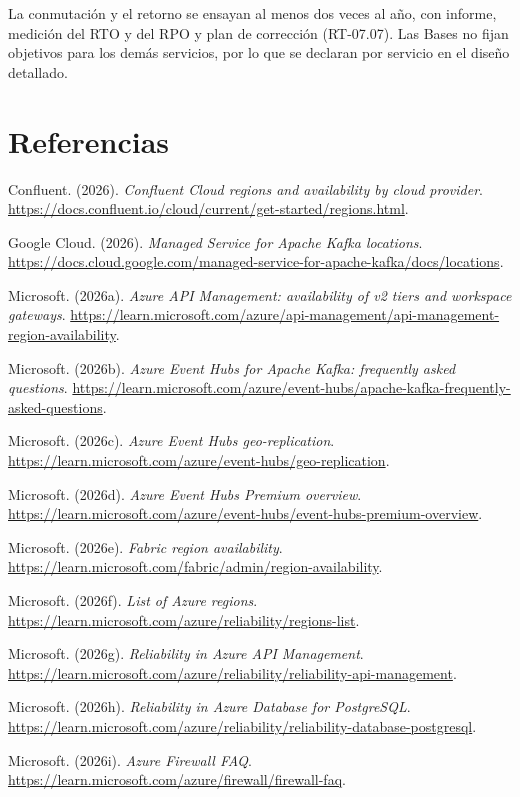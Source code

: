 \documentclass[11pt]{article}
\begin{document}
La conmutación y el retorno se ensayan al menos dos veces al año, con informe, medición del RTO y del RPO y plan de corrección (RT-07.07). Las Bases no fijan objetivos para los demás servicios, por lo que se declaran por servicio en el diseño detallado.

\section*{Referencias}

Confluent. (2026). \textit{Confluent Cloud regions and availability by cloud provider}. \url{https://docs.confluent.io/cloud/current/get-started/regions.html}.

Google Cloud. (2026). \textit{Managed Service for Apache Kafka locations}. \url{https://docs.cloud.google.com/managed-service-for-apache-kafka/docs/locations}.

Microsoft. (2026a). \textit{Azure API Management: availability of v2 tiers and workspace gateways}. \url{https://learn.microsoft.com/azure/api-management/api-management-region-availability}.

Microsoft. (2026b). \textit{Azure Event Hubs for Apache Kafka: frequently asked questions}. \url{https://learn.microsoft.com/azure/event-hubs/apache-kafka-frequently-asked-questions}.

Microsoft. (2026c). \textit{Azure Event Hubs geo-replication}. \url{https://learn.microsoft.com/azure/event-hubs/geo-replication}.

Microsoft. (2026d). \textit{Azure Event Hubs Premium overview}. \url{https://learn.microsoft.com/azure/event-hubs/event-hubs-premium-overview}.

Microsoft. (2026e). \textit{Fabric region availability}. \url{https://learn.microsoft.com/fabric/admin/region-availability}.

Microsoft. (2026f). \textit{List of Azure regions}. \url{https://learn.microsoft.com/azure/reliability/regions-list}.

Microsoft. (2026g). \textit{Reliability in Azure API Management}. \url{https://learn.microsoft.com/azure/reliability/reliability-api-management}.

Microsoft. (2026h). \textit{Reliability in Azure Database for PostgreSQL}. \url{https://learn.microsoft.com/azure/reliability/reliability-database-postgresql}.

Microsoft. (2026i). \textit{Azure Firewall FAQ}. \url{https://learn.microsoft.com/azure/firewall/firewall-faq}.
\end{document}
